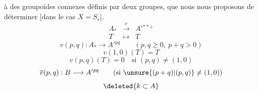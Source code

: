  à des groupoïdes connexes définis par deux groupes, que nous nous proposons de déterminer [dans le cas $X=S_s$].
\[
\begin{array}{rcl}A_*&\xrightarrow{v}&A'{}^{**+}\\T&\longmapsto&T\end{array}
\]
\[
v(p,q):A_*\longrightarrow A'{}^{pq}\qquad(p,q\geq0,\ p+q>0)
\]
\[
v(1,0)(T)=T
\]
\[
v(p,q)(T)=0\quad\text{si }(p,q)\neq(1,0)
\]
\[
\overline v(p,q):B\longrightarrow A'{}^{pq}\qquad\text{(si }\unsure{(p+q)|(p,q)}\neq(1,0)\text{)}
\]
\[\deleted{k\subset A}\]
